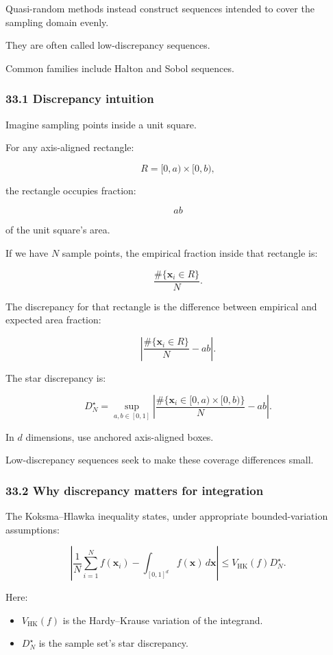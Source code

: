 Quasi-random methods instead construct sequences intended to cover the sampling domain evenly.

They are often called low-discrepancy sequences.

Common families include Halton and Sobol sequences.

\subsubsection{33.1 Discrepancy intuition}\label{discrepancy-intuition}

Imagine sampling points inside a unit square.

For any axis-aligned rectangle:

\[ R=[0,a)\times[0,b), \]

the rectangle occupies fraction:

\[ ab \]

of the unit square's area.

If we have \(N\) sample points, the empirical fraction inside that rectangle is:

\[ \frac{\#\{\mathbf x_i\in R\}}{N}. \]

The discrepancy for that rectangle is the difference between empirical and expected area fraction:

\[ \left| \frac{\#\{\mathbf x_i\in R\}}{N}-ab \right|. \]

The star discrepancy is:

\[ \boxed{ D_N^\star= \sup_{a,b\in[0,1]} \left| \frac{\#\{\mathbf x_i\in[0,a)\times[0,b)\}}N-ab \right| }. \]

In \(d\) dimensions, use anchored axis-aligned boxes.

Low-discrepancy sequences seek to make these coverage differences small.

\subsubsection{33.2 Why discrepancy matters for integration}\label{why-discrepancy-matters-for-integration}

The Koksma--Hlawka inequality states, under appropriate bounded-variation assumptions:

\[ \boxed{ \left| \frac1N\sum_{i=1}^{N}f(\mathbf x_i) - \int_{[0,1]^d}f(\mathbf x)\,d\mathbf x \right| \le V_{\mathrm{HK}}(f)D_N^\star }. \]

Here:

\begin{itemize}
\tightlist
\item
  \(V_{\mathrm{HK}}(f)\) is the Hardy--Krause variation of the integrand.
\item
  \(D_N^\star\) is the sample set's star discrepancy.
\end{itemize}

